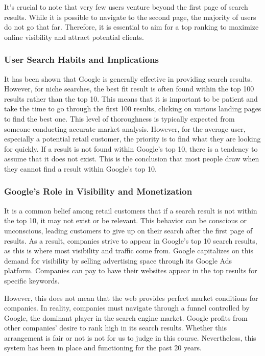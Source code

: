 It's crucial to note that very few users venture beyond the first page
of search results. While it is possible to navigate to the second page,
the majority of users do not go that far. Therefore, it is essential to
aim for a top ranking to maximize online visibility and attract
potential clients.

\subsubsection{User Search Habits and
  Implications}\label{user-search-habits-and-implications}

It has been shown that Google is generally effective in providing search
results. However, for niche searches, the best fit result is often found
within the top 100 results rather than the top 10. This means that it is
important to be patient and take the time to go through the first 100
results, clicking on various landing pages to find the best one. This
level of thoroughness is typically expected from someone conducting
accurate market analysis. However, for the average user, especially a
potential retail customer, the priority is to find what they are looking
for quickly. If a result is not found within Google's top 10, there is a
tendency to assume that it does not exist. This is the conclusion that
most people draw when they cannot find a result within Google's top 10.

\subsubsection{Google's Role in Visibility and
  Monetization}\label{googles-role-in-visibility-and-monetization}

It is a common belief among retail customers that if a search result is
not within the top 10, it may not exist or be relevant. This behavior
can be conscious or unconscious, leading customers to give up on their
search after the first page of results. As a result, companies strive to
appear in Google's top 10 search results, as this is where most
visibility and traffic come from. Google capitalizes on this demand for
visibility by selling advertising space through its Google Ads platform.
Companies can pay to have their websites appear in the top results for
specific keywords.

However, this does not mean that the web provides perfect market
conditions for companies. In reality, companies must navigate through a
funnel controlled by Google, the dominant player in the search engine
market. Google profits from other companies' desire to rank high in its
search results. Whether this arrangement is fair or not is not for us to
judge in this course. Nevertheless, this system has been in place and
functioning for the past 20 years.

